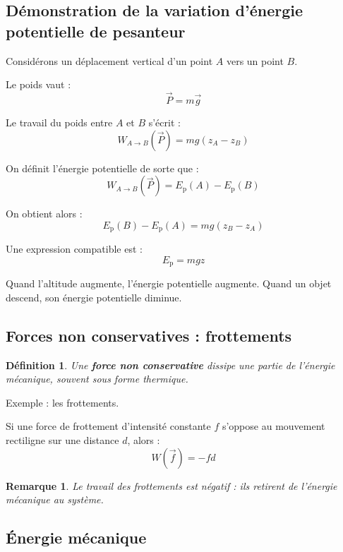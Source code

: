\documentclass[11pt,a4paper]{article}
\newtheorem{definition}{Définition}[section]
\newtheorem{remarque}{Remarque}[section]
\newcommand{\Ep}{E_\mathrm{p}}
\begin{document}
\subsection{Démonstration de la variation d'énergie potentielle de pesanteur}

Considérons un déplacement vertical d'un point $A$ vers un point $B$.

Le poids vaut :
\[
\vec{P}=m\vec{g}
\]

Le travail du poids entre $A$ et $B$ s'écrit :
\[
W_{A\to B}(\vec{P}) = mg(z_A-z_B)
\]

On définit l'énergie potentielle de sorte que :
\[
W_{A\to B}(\vec{P}) = \Ep(A)-\Ep(B)
\]

On obtient alors :
\[
\Ep(B)-\Ep(A)=mg(z_B-z_A)
\]

Une expression compatible est :
\[
\Ep = mgz
\]

\begin{attentionbox}
Quand l'altitude augmente, l'énergie potentielle augmente.  
Quand un objet descend, son énergie potentielle diminue.
\end{attentionbox}

\subsection{Forces non conservatives : frottements}

\begin{definition}
Une \textbf{force non conservative} dissipe une partie de l'énergie mécanique, souvent sous forme thermique.
\end{definition}

Exemple : les frottements.

Si une force de frottement d'intensité constante $f$ s'oppose au mouvement rectiligne sur une distance $d$, alors :
\[
W(\vec{f})=-fd
\]

\begin{remarque}
Le travail des frottements est négatif : ils retirent de l'énergie mécanique au système.
\end{remarque}

\subsection{Énergie mécanique}
\end{document}
